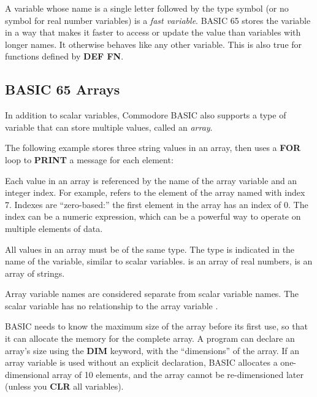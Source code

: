 A variable whose name is a single letter followed by the type symbol (or no
symbol for real number variables) is a {\em fast variable}. BASIC 65 stores
the variable in a way that makes it faster to access or update the value than
variables with longer names. It otherwise behaves like any other variable.
This is also true for functions defined by {\bf DEF FN}.

\subsection{BASIC 65 Arrays}

In addition to scalar variables, Commodore BASIC also supports a type of
variable that can store multiple values, called an {\em array}.

The following example stores three string values in an array, then uses a {\bf
FOR} loop to {\bf PRINT} a message for each element:


Each value in an array is referenced by the name of the array variable and an
integer index. For example,  refers to the element of the
array named  with index 7. Indexes are ``zero-based:'' the
first element in the array has an index of 0. The index can be a numeric
expression, which can be a powerful way to operate on multiple elements of
data.

All values in an array must be of the same type. The type is indicated in the
name of the variable, similar to scalar variables.  is an
array of real numbers,  is an array of strings.

Array variable names are considered separate from scalar variable names. The
scalar variable  has no relationship to the array variable
.

BASIC needs to know the maximum size of the array before its first use, so
that it can allocate the memory for the complete array. A program can declare
an array's size using the {\bf DIM} keyword, with the ``dimensions'' of the
array. If an array variable is used without an explicit declaration, BASIC
allocates a one-dimensional array of 10 elements, and the array cannot be
re-dimensioned later (unless you {\bf CLR} all variables).

